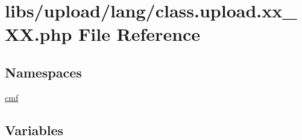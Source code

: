 \hypertarget{class_8upload_8xx___x_x_8php}{}\section{libs/upload/lang/class.upload.\+xx\+\_\+\+X\+X.\+php File Reference}
\label{class_8upload_8xx___x_x_8php}
\subsection*{Namespaces}
\begin{DoxyCompactItemize}
\item 
 \hyperlink{namespacecmf}{cmf}
\end{DoxyCompactItemize}
\subsection*{Variables}
